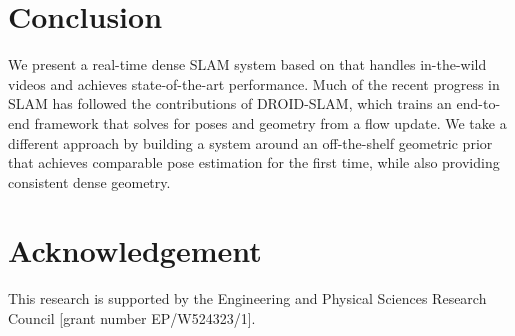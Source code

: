 \documentclass[10pt,twocolumn,letterpaper]{article}
\begin{document}
\section{Conclusion}
\label{sec:conclusion}
We present a real-time dense SLAM system based on \master that handles in-the-wild videos and achieves state-of-the-art performance.  Much of the recent progress in SLAM has followed the contributions of DROID-SLAM, which trains an end-to-end framework that solves for poses and geometry from a flow update.
We take a different approach by building a system around an off-the-shelf geometric prior that achieves comparable pose estimation for the first time, while also providing consistent dense geometry.

\section{Acknowledgement}
This research is supported by the Engineering and Physical
Sciences Research Council [grant number EP/W524323/1].
{
    \small
    
    
}


\end{document}
